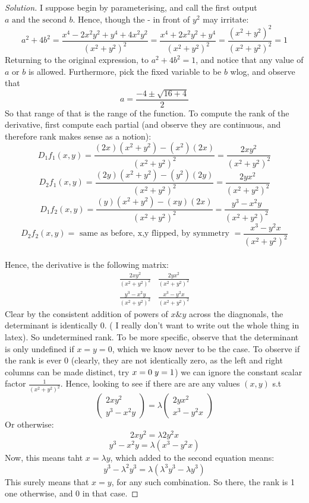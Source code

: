 \documentclass{article}
\newenvironment{problem}[2][Problem]{\begin{trivlist}
\item[\hskip \labelsep {\bfseries #1}\hskip \labelsep {\bfseries #2.}]}{\end{trivlist}}
\newenvironment{solution}{\begin{proof}[Solution]}{\end{proof}}
\begin{document}
\begin{problem}{9.24}
\end{problem}
\begin{solution}
	I suppose begin by parameterising, and call the first output $a \text{ and the second }b$. Hence, though the - in front of $y^{2}$ may irritate: \[
		a^{2}+4b^{2} = \frac{x^{4}-2x^{2}y^{2}+y^{4} + 4x^{2}y^{2}}{(x^{2}+y^{2})^{2}} = \frac{x^{4}+2x^{2}y^{2}+y^{4}}{(x^{2}+y^{2})^{2}} = \frac{(x^{2}+y^{2})^{2}}{(x^{2}+y^{2})^{2}} = 1
	\]
	Returning to the original expression, to $a^{2}+4b^{2}=1$, and notice that any value of $a \text{ or } b$ is allowed. Furthermore, pick the fixed variable to be $b$ wlog, and observe that \[
		a = \frac{-4 \pm \sqrt{16+4} }{2}
	\]
So that range of that is the range of the function.
To compute the rank of the derivative, first compute each partial (and observe they are continuous, and therefore rank makes sense as a notion):
\[
	D_{1}f_{1}(x,y) = \frac{(2x)(x^{2}+y^{2}) - (x^{2})(2x)}{(x^{2}+y^{2})^{2}} = \frac{2xy^{2}}{(x^{2}+y^{2})^{2}}
\]
\[
	D_{2}f_{1}(x,y) = \frac{(2y)(x^{2}+y^{2}) - (y^{2})(2y)}{(x^{2}+y^{2})^{2}} = \frac{2yx^{2}}{(x^{2}+y^{2})^{2}}
\]
\[
	D_{1}f_{2}(x,y) = \frac{(y)(x^{2}+y^{2}) - (xy)(2x)}{(x^{2}+y^{2})^{2}} = \frac{y^{3}-x^{2}y}{(x^{2}+y^{2})^{2}}
\]
\[
		D_{2}f_{2}(x,y) = \text{ same as before, x,y flipped, by symmetry } = \frac{x^{3}-y^{2}x}{(x^{2}+y^{2})^{2}}
\]
\\
Hence, the derivative is the following matrix:
\[
	\begin{matrix}
		\frac{2xy^{2}}{(x^{2}+y^{2})^{2}} &  \frac{2yx^{2}}{(x^{2}+y^{2})^{2}} \\
		\frac{y^{3}-x^{2}y}{(x^{2}+y^{2})^{2}} & \frac{x^{3} - y^{2}x}{(x^{2}+y^{2})^{2}}
	\end{matrix}
\]
Clear by the consistent addition of powers of $x \text{\&} y$ across the diagnonals, the determinant is identically 0. ( I really don't want to write out the whole thing in latex).
So undetermined rank. To be more specific, observe that the determinant is only undefined if $x=y=0$, which we know never to be the case. To observe if the rank is ever 0 (clearly, they are not identically zero, as the left and right columns can be made distinct, try $x=0 \hspace{1mm} y =1$) we can ignore the constant scalar factor $\frac{1}{(x^{2}+y^{2})^2}$. Hence, looking to see if there are are any values $(x,y)$ s.t \[
	\begin{pmatrix}
		2xy^2 \\
		y^{3}-x^{2}y
	\end{pmatrix} = 
	\lambda \begin{pmatrix}
		2yx^2 \\
		x^{3}-y^{2}x
	\end{pmatrix}
\]
Or otherwise:
\[
2xy^{2} = \lambda 2y^{2}x
\]
\[
y^{3}-x^{2}y= \lambda (x^{3}-y^{2}x)\]
Now, this means taht $x = \lambda y $, which added to the second equation means:
\[
	y^{3} - \lambda^{2}y^{3} = \lambda(\lambda^{3}y^{3}- \lambda y^{3})
\]
This surely means that $x=y$, for any such combination. So there, the rank is 1 one otherwise, and 0 in that case. 
\newpage
\end{solution}
\begin{problem}{9.27}
\end{problem}
\end{document}
